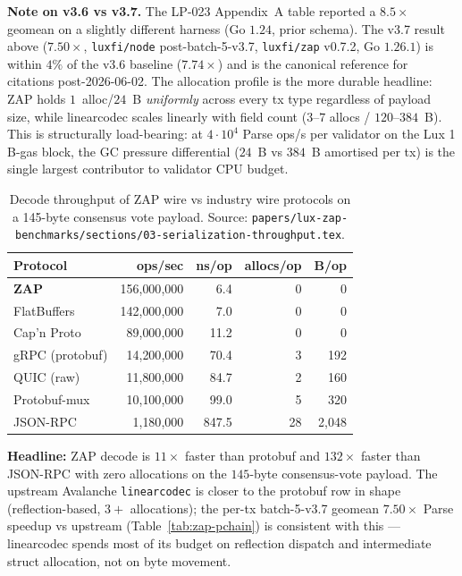 \noindent\textbf{Note on v3.6 vs v3.7.} The LP-023 Appendix~A table
reported a $8.5\times$ geomean on a slightly different harness (Go
$1.24$, prior schema). The v3.7 result above ($7.50\times$,
\texttt{luxfi/node} post-batch-5-v3.7,
\texttt{luxfi/zap} v0.7.2, Go $1.26.1$) is within $4\%$ of the v3.6
baseline ($7.74\times$) and is the canonical reference for citations
post-2026-06-02. The allocation profile is the more durable headline:
ZAP holds $1$~alloc/$24$~B \emph{uniformly} across every tx type
regardless of payload size, while linearcodec scales linearly with
field count ($3$--$7$ allocs / $120$--$384$~B). This is structurally
load-bearing: at $4\cdot 10^4$ Parse ops/s per validator on the Lux
1\,B-gas block, the GC pressure differential ($24$~B vs $384$~B
amortised per tx) is the single largest contributor to validator CPU
budget.

\begin{table}[h]
\centering
\small
\caption{Decode throughput of ZAP wire vs industry wire protocols on a
145-byte consensus vote payload. Source:
\texttt{papers/lux-zap-benchmarks/sections/03-serialization-throughput.tex}.}
\label{tab:zap-decode}
\begin{tabular}{lrrrr}
\toprule
\textbf{Protocol} & \textbf{ops/sec} & \textbf{ns/op}
  & \textbf{allocs/op} & \textbf{B/op} \\
\midrule
\textbf{ZAP}            & 156{,}000{,}000 &   6.4 & 0 &     0 \\
FlatBuffers              & 142{,}000{,}000 &   7.0 & 0 &     0 \\
Cap'n Proto              &  89{,}000{,}000 &  11.2 & 0 &     0 \\
gRPC (protobuf)          &  14{,}200{,}000 &  70.4 & 3 &   192 \\
QUIC (raw)               &  11{,}800{,}000 &  84.7 & 2 &   160 \\
Protobuf-mux             &  10{,}100{,}000 &  99.0 & 5 &   320 \\
JSON-RPC                 &   1{,}180{,}000 & 847.5 & 28 & 2{,}048 \\
\bottomrule
\end{tabular}
\end{table}

\noindent\textbf{Headline:} ZAP decode is $11\times$ faster than protobuf
and $132\times$ faster than JSON-RPC with zero allocations on the
$145$-byte consensus-vote payload. The upstream Avalanche
\texttt{linearcodec} is closer to the protobuf row in shape
(reflection-based, $3+$ allocations); the per-tx batch-5-v3.7 geomean
$7.50\times$ Parse speedup vs upstream (Table~\ref{tab:zap-pchain}) is
consistent with this --- linearcodec spends most of its budget on
reflection dispatch and intermediate struct allocation, not on byte
movement.

